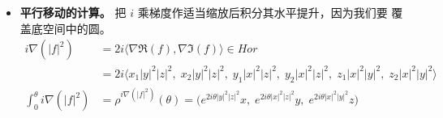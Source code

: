 \begin{example}[三维局部情形]
\begin{itemize}[leftmargin=2.2em,itemsep=0.25em]
\begin{proof}
纤维恰为 $f$ 的水平集。
\begin{equation}\label{eq:4-2}
\begin{aligned}
\ker(d_pf)&=T_p(f^{-1}(c)),\qquad p\in f^{-1}(c)\\
\ker(\de f)&=\ker(\de\Re(f))\cap\ker(\de\Im(f))\\
\ker(\de\Re(f)(\cdot))&=\ker(\omega_0(X_{\Re(f)},\cdot))\ni X_{\Re(f)}\\
f\ \text{全纯}\ \Longrightarrow\ \nabla(\Re(f))&=-J\nabla(\Im(f))\\
\therefore\ \nabla(\Re(f))&=-JX_{\Re(f)}=X_{\Im(f)}
\ \Longrightarrow\ X_{\Im(f)}\in\ker(\de\Re(f))\\
\therefore\ H&=\big\langle X_{\Re(f)},X_{\Im(f)}\big\rangle
=\big\langle\nabla(\Re(f)),\nabla(\Im(f))\big\rangle
\end{aligned}
\end{equation}
\end{proof}

\item \textbf{平行移动的计算。} 把 $i$ 乘梯度作适当缩放后积分其水平提升，因为我们要
覆盖底空间中的圆。
\begin{equation}\label{eq:4-3}
\begin{aligned}
i\nabla(|f|^2)&=2i\langle\nabla\Re(f),\nabla\Im(f)\rangle\in Hor\\
&=2i\big\langle x_1|y|^2|z|^2,\;x_2|y|^2|z|^2,\;y_1|x|^2|z|^2,\;
y_2|x|^2|z|^2,\;z_1|x|^2|y|^2,\;z_2|x|^2|y|^2\big\rangle\\
\int_0^\theta i\nabla(|f|^2)&=\rho^{i\nabla(|f|^2)}(\theta)
=\big(e^{2i\theta|y|^2|z|^2}x,\;e^{2i\theta|x|^2|z|^2}y,\;
e^{2i\theta|x|^2|y|^2}z\big)
\end{aligned}
\end{equation}
\end{itemize}
\end{example}

